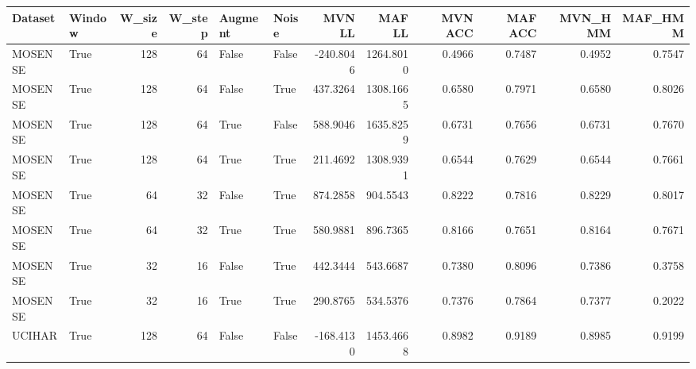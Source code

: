 \begin{tabular}{llrrllrrrrrr}
\toprule
Dataset &  Window &  W\_size &  W\_step &  Augment &  Noise &    MVN LL &    MAF LL &  MVN ACC &  MAF ACC &  MVN\_HMM &  MAF\_HMM \\
\midrule
MOSENSE &    True &     128 &      64 &    False &  False & -240.8046 & 1264.8010 &   0.4966 &   0.7487 &   0.4952 &   0.7547 \\
MOSENSE &    True &     128 &      64 &    False &   True &  437.3264 & 1308.1665 &   0.6580 &   0.7971 &   0.6580 &   0.8026 \\
MOSENSE &    True &     128 &      64 &     True &  False &  588.9046 & 1635.8259 &   0.6731 &   0.7656 &   0.6731 &   0.7670 \\
MOSENSE &    True &     128 &      64 &     True &   True &  211.4692 & 1308.9391 &   0.6544 &   0.7629 &   0.6544 &   0.7661 \\
MOSENSE &    True &      64 &      32 &    False &   True &  874.2858 &  904.5543 &   0.8222 &   0.7816 &   0.8229 &   0.8017 \\
MOSENSE &    True &      64 &      32 &     True &   True &  580.9881 &  896.7365 &   0.8166 &   0.7651 &   0.8164 &   0.7671 \\
MOSENSE &    True &      32 &      16 &    False &   True &  442.3444 &  543.6687 &   0.7380 &   0.8096 &   0.7386 &   0.3758 \\
MOSENSE &    True &      32 &      16 &     True &   True &  290.8765 &  534.5376 &   0.7376 &   0.7864 &   0.7377 &   0.2022 \\
 UCIHAR &    True &     128 &      64 &    False &  False & -168.4130 & 1453.4668 &   0.8982 &   0.9189 &   0.8985 &   0.9199 \\
\bottomrule
\end{tabular}
